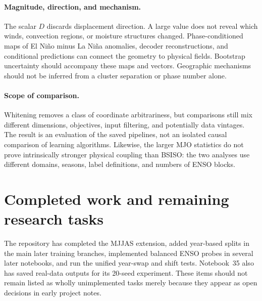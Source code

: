 \documentclass[11pt]{article}
\begin{document}
\paragraph{Magnitude, direction, and mechanism.}
The scalar $D$ discards displacement direction. A large value does not reveal which winds, convection regions, or moisture structures changed. Phase-conditioned maps of El Ni\~no minus La Ni\~na anomalies, decoder reconstructions, and conditional predictions can connect the geometry to physical fields. Bootstrap uncertainty should accompany these maps and vectors. Geographic mechanisms should not be inferred from a cluster separation or phase number alone.

\paragraph{Scope of comparison.}
Whitening removes a class of coordinate arbitrariness, but comparisons still mix different dimensions, objectives, input filtering, and potentially data vintages. The result is an evaluation of the saved pipelines, not an isolated causal comparison of learning algorithms. Likewise, the larger MJO statistics do not prove intrinsically stronger physical coupling than BSISO: the two analyses use different domains, seasons, label definitions, and numbers of ENSO blocks.

\section{Completed work and remaining research tasks}
\label{sec:tasks}

The repository has completed the MJJAS extension, added year-based splits in the main later training branches, implemented balanced ENSO probes in several later notebooks, and run the unified year-swap and shift tests. Notebook~35 also has saved real-data outputs for its 20-seed experiment. These items should not remain listed as wholly unimplemented tasks merely because they appear as open decisions in early project notes.
\end{document}

